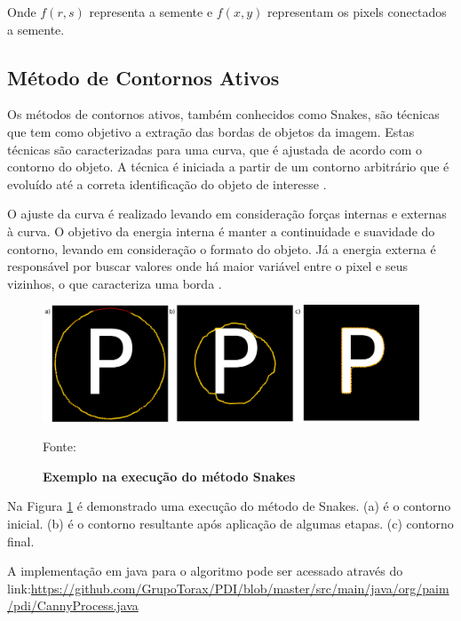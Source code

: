 \documentclass[
	12pt,				%
	oneside,			%
	a4paper,			%
	english,			%
	french,				%
	spanish,			%
	brazil,				%
	]{abntex2}
\begin{document}
Onde \(f(r,s)\) representa a semente e \(f(x, y)\) representam os pixels conectados a semente.
    
\subsection{Método de Contornos Ativos}     

Os métodos de contornos ativos, também conhecidos como Snakes, são técnicas que tem como objetivo a extração das bordas de objetos da imagem. Estas técnicas são caracterizadas para uma curva, que é ajustada de acordo com o contorno do objeto. A técnica é iniciada a partir de um contorno arbitrário que é evoluído até a correta identificação do objeto de interesse \cite{conciAzevedoLeta:2008}.

O ajuste da curva é realizado levando em consideração forças internas e externas à curva. O objetivo da energia interna é manter a continuidade e suavidade do contorno, levando em consideração o formato do objeto. Já a energia externa é responsável por buscar valores onde há maior variável entre o pixel e seus vizinhos, o que caracteriza uma borda \cite{kass:1988}.

\begin{figure}[ht]
\centering
\caption{\textbf{Exemplo na execução do método Snakes}}
\includegraphics[width=1\textwidth]{imagens/snake.png}

Fonte: \citet{pedriniSchwartz:2008}
\label{fig:snake}
\end{figure}

Na Figura \ref{fig:snake} é demonstrado uma execução do método de Snakes. (a) é o contorno inicial. (b) é o contorno resultante após aplicação de algumas etapas. (c) contorno final.

A implementação em java para o algoritmo pode ser acessado através do link:\url{https://github.com/GrupoTorax/PDI/blob/master/src/main/java/org/paim/pdi/CannyProcess.java}


\end{document}
